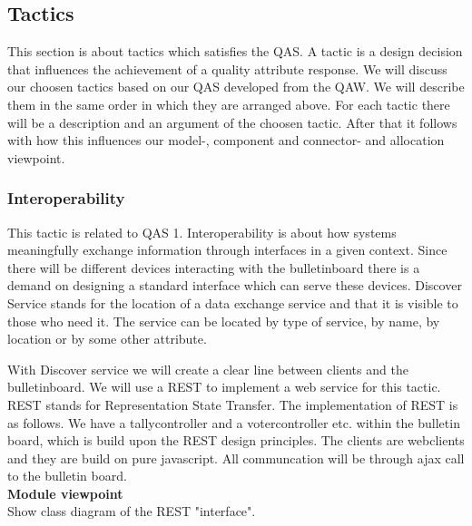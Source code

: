 \subsection{Tactics}
This section is about tactics which satisfies the QAS. A tactic is a design decision that influences the achievement of a quality attribute response. We will discuss our choosen tactics based on our QAS developed from the QAW. We will describe them in the same order in which they are arranged above. For each tactic there will be a description and an argument of the choosen tactic. After that it follows with how this influences our model-, component and connector- and allocation viewpoint. 


\noindent
\subsubsection{Interoperability}
This tactic is related to QAS 1. Interoperability is about how systems meaningfully exchange information through interfaces in a given context. Since there will be different devices interacting with the bulletinboard there is a demand on designing a standard interface which can serve these devices. Discover Service stands for the location of a data exchange service and that it is visible to those who need it. The service can be located by type of service, by name, by location or by some other attribute.


\begin{center}
\end{center}


\noindent
With Discover service we will create a clear line between clients and the bulletinboard. We will use a REST to implement a web service for this tactic.\\

\noindent
REST stands for Representation State Transfer. The implementation of REST is as follows. We have a tallycontroller and a votercontroller etc. within the bulletin board, which is build upon the REST design principles. The clients are webclients and they are build on pure javascript. All communcation will be through ajax call to the bulletin board.\\


\noindent
\textbf{Module viewpoint}\\
Show class diagram of the REST "interface".\\

